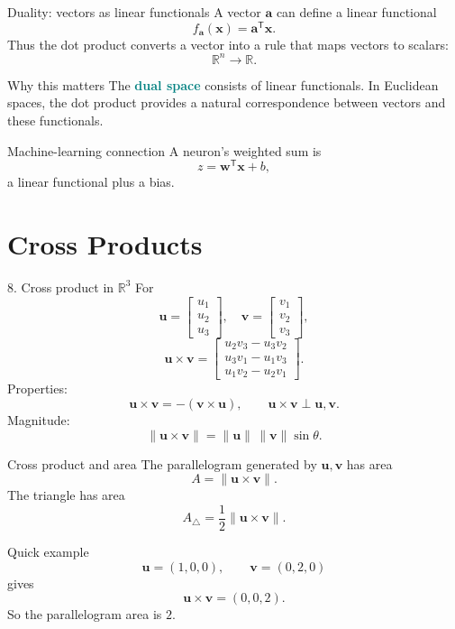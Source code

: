\documentclass[aspectratio=169,11pt]{beamer}
\newcommand{\R}{\mathbb{R}}
\newcommand{\vect}[1]{\bm{#1}}
\newcommand{\T}{^{\mathsf T}}
\newcommand{\important}[1]{\textcolor{teal}{\textbf{#1}}}
\begin{document}
\begin{frame}{Duality: vectors as linear functionals}
A vector $\vect a$ can define a linear functional
\[
f_{\vect a}(\vect x)=\vect a\T\vect x.
\]
Thus the dot product converts a vector into a rule that maps vectors to scalars:
\[
\R^n\longrightarrow\R.
\]
\begin{block}{Why this matters}
The \important{dual space} consists of linear functionals. In Euclidean spaces, the dot product provides a natural correspondence between vectors and these functionals.
\end{block}
\begin{exampleblock}{Machine-learning connection}
A neuron's weighted sum is
\[
z=\vect w\T\vect x+b,
\]
a linear functional plus a bias.
\end{exampleblock}
\end{frame}

\section{Cross Products}
\begin{frame}{8. Cross product in $\R^3$}
For
\[
\vect u=\begin{bmatrix}u_1\\u_2\\u_3\end{bmatrix},
\quad
\vect v=\begin{bmatrix}v_1\\v_2\\v_3\end{bmatrix},
\]
\[
\vect u\times\vect v=
\begin{bmatrix}
u_2v_3-u_3v_2\\
u_3v_1-u_1v_3\\
u_1v_2-u_2v_1
\end{bmatrix}.
\]
Properties:
\[
\vect u\times\vect v=-(\vect v\times\vect u),
\qquad
\vect u\times\vect v\perp\vect u,\vect v.
\]
Magnitude:
\[
\|\vect u\times\vect v\|
=\|\vect u\|\,\|\vect v\|\sin\theta.
\]
\end{frame}

\begin{frame}{Cross product and area}
The parallelogram generated by $\vect u,\vect v$ has area
\[
A=\|\vect u\times\vect v\|.
\]
The triangle has area
\[
A_{\triangle}=\frac12\|\vect u\times\vect v\|.
\]
\begin{exampleblock}{Quick example}
\[
\vect u=(1,0,0),\qquad\vect v=(0,2,0)
\]
gives
\[
\vect u\times\vect v=(0,0,2).
\]
So the parallelogram area is $2$.
\end{exampleblock}
\end{frame}
\end{document}
